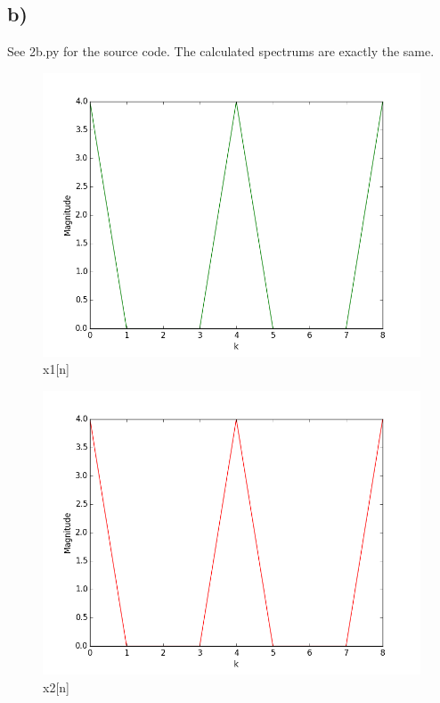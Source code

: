 \subsection*{b)}
See 2b.py for the source code. The calculated spectrums are exactly the same.

\begin{figure}[H]
  \centering
  \includegraphics[width=\linewidth]{2b_1}
  \caption{x1[n]}
  \label{fig:2b1}
\end{figure}
\begin{figure}[H]
  \centering
  \includegraphics[width=\linewidth]{2b_2}
  \caption{x2[n]}
  \label{fig:2b2}
\end{figure}
